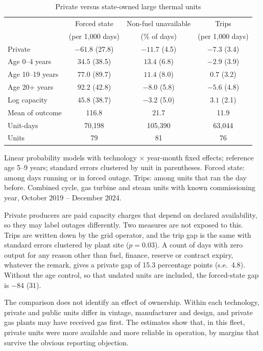 \documentclass[11pt]{article}
\begin{document}
\begin{table}[t]
\centering\small
\caption{Private versus state-owned large thermal units}\label{tab:own}
\begin{threeparttable}
\begin{tabular}{lccc}
\toprule
 & Forced state & Non-fuel unavailable & Trips \\
 & (per 1,000 days) & (\% of days) & (per 1,000 days) \\
\midrule
Private & $-61.8$ (27.8) & $-11.7$ (4.5) & $-7.3$ (3.4) \\
Age 0--4 years & $34.5$ (38.5) & $13.4$ (6.8) & $-2.9$ (3.9) \\
Age 10--19 years & $77.0$ (89.7) & $11.4$ (8.0) & $0.7$ (3.2) \\
Age 20+ years & $92.2$ (42.8) & $-8.0$ (5.8) & $-5.6$ (4.8) \\
Log capacity & $45.8$ (38.7) & $-3.2$ (5.0) & $3.1$ (2.1) \\
\midrule
Mean of outcome & 116.8 & 21.7 & 11.9 \\
Unit-days & 70,198 & 105,390 & 63,044 \\
Units & 79 & 81 & 76 \\
\bottomrule
\end{tabular}
\begin{tablenotes}\footnotesize
\item Linear probability models with technology $\times$ year-month fixed effects; reference age 5--9 years; standard errors clustered by unit in parentheses. Forced state: among days running or in forced outage. Trips: among units that ran the day before. Combined cycle, gas turbine and steam units with known commissioning year, October 2019 -- December 2024.
\end{tablenotes}
\end{threeparttable}
\end{table}

Private producers are paid capacity charges that depend on declared availability, so they may label outages differently. Two measures are not exposed to this. Trips are written down by the grid operator, and the trip gap is the same with standard errors clustered by plant site ($p=0.03$). A count of days with zero output for any reason other than fuel, finance, reserve or contract expiry, whatever the remark, gives a private gap of 15.3 percentage points (s.e.\ 4.8). Without the age control, so that undated units are included, the forced-state gap is $-84$ (31).

The comparison does not identify an effect of ownership. Within each technology, private and public units differ in vintage, manufacturer and design, and private gas plants may have received gas first. The estimates show that, in this fleet, private units were more available and more reliable in operation, by margins that survive the obvious reporting objection.
\end{document}

